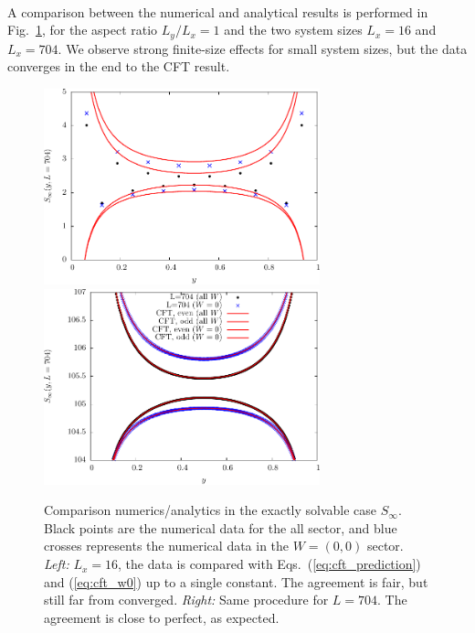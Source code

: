 \documentclass[11pt]{iopart}
\begin{document}
\paragraph{}
A comparison between the numerical and analytical results is performed in Fig.~\ref{fig:Sinfty}, for the aspect ratio $L_y/L_x=1$ and the two system sizes $L_x=16$ and $L_x=704$. We observe strong finite-size effects for small system sizes, but the data converges in the end to the CFT result.
\begin{figure}[ht]
 \begin{center}
  \includegraphics[width=8cm]{./figures/sinfty_16.pdf}
  \includegraphics[width=8cm]{./figures/sinfty_704.pdf}
 \end{center}
\caption{Comparison numerics/analytics in the exactly solvable case $S_\infty$. Black points are the numerical data for the all sector, and blue crosses represents the numerical data in the $W=(0,0)$ sector. \emph{Left:} $L_x=16$, the data is compared with Eqs.~(\ref{eq:cft_prediction}) and (\ref{eq:cft_w0}) up to a single constant. The agreement is fair, but still far from converged. \emph{Right:} Same procedure for $L=704$. The agreement is close to perfect, as expected. }
\label{fig:Sinfty}
\end{figure}
\end{document}
